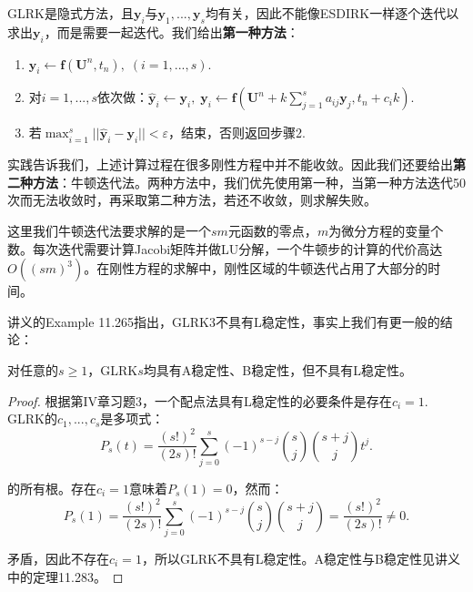 \documentclass[lang=cn,10pt,bibend=bibtex]{elegantbook}
\begin{document}
\vspace{-1em}

GLRK是隐式方法，且$\mathbf{y}_i$与$\mathbf{y}_1,...,\mathbf{y}_s$均有关，因此不能像ESDIRK一样逐个迭代以求出$\mathbf{y}_i$，而是需要一起迭代。我们给出\textbf{第一种方法}：

\begin{enumerate}[itemindent=1em]
  \item $\mathbf{y}_i\gets \mathbf{f}(\mathbf{U}^n,t_n),\;(i=1,...,s)$.
  \item 对$i=1,...,s$依次做：$\hat{\mathbf{y}}_i\gets \mathbf{y}_i,\;\mathbf{y}_i\gets\mathbf{f}(\mathbf{U}^n+k\sum_{j=1}^s a_{ij}\mathbf{y}_j, t_n+c_ik)$.
  \item 若$\max_{i=1}^s ||\hat{\mathbf{y}}_i-\mathbf{y}_i||<\varepsilon$，结束，否则返回步骤2.
\end{enumerate}

实践告诉我们，上述计算过程在很多刚性方程中并不能收敛。因此我们还要给出\textbf{第二种方法}：牛顿迭代法。两种方法中，我们优先使用第一种，当第一种方法迭代50次而无法收敛时，再采取第二种方法，若还不收敛，则求解失败。

这里我们牛顿迭代法要求解的是一个$sm$元函数的零点，$m$为微分方程的变量个数。每次迭代需要计算Jacobi矩阵并做LU分解，一个牛顿步的计算的代价高达$O((sm)^3)$。在刚性方程的求解中，刚性区域的牛顿迭代占用了大部分的时间。

讲义的Example 11.265指出，GLRK$3$不具有L稳定性，事实上我们有更一般的结论：

\begin{theorem}
  对任意的$s\geq 1$，GLRK$s$均具有A稳定性、B稳定性，但不具有L稳定性。
\end{theorem}

\begin{proof}
  根据\cite{2002Solving}第IV章习题3，一个配点法具有L稳定性的必要条件是存在$c_i=1$. GLRK的$c_1,...,c_s$是多项式：
  \begin{equation}
    P_s(t)=\frac{(s!)^2}{(2s)!}\sum_{j=0}^s (-1)^{s-j}\binom{s}{j}\binom{s+j}{j}t^j.
  \end{equation}

  的所有根。存在$c_i=1$意味着$P_s(1)=0$，然而：
  \begin{equation*}
    P_s(1)=\frac{(s!)^2}{(2s)!}\sum_{j=0}^s (-1)^{s-j}\binom{s}{j}\binom{s+j}{j}=\frac{(s!)^2}{(2s)!}\neq 0.
  \end{equation*}

  矛盾，因此不存在$c_i=1$，所以GLRK不具有L稳定性。A稳定性与B稳定性见讲义中的定理11.283。
\end{proof}
\end{document}
